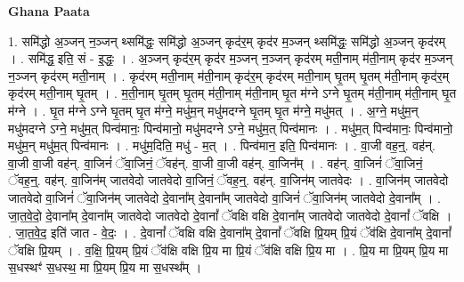 \documentclass[17pt]{extarticle}
\begin{document}
\textbf{Ghana Paata } \newline

1. समि॑द्धो अ॒ञ्जन् न॒ञ्जन् थ्समि॑द्धः॒ समि॑द्धो अ॒ञ्जन् कृद॑र॒म् कृद॑र म॒ञ्जन् थ्समि॑द्धः॒ समि॑द्धो अ॒ञ्जन् कृद॑रम् । . समि॑द्ध॒ इति॒ सं - इ॒द्धः॒ । . अ॒ञ्जन् कृद॑र॒म् कृद॑र म॒ञ्जन् न॒ञ्जन् कृद॑रम् मती॒नाम् म॑ती॒नाम् कृद॑र म॒ञ्जन् न॒ञ्जन् कृद॑रम् मती॒नाम् । . कृद॑रम् मती॒नाम् म॑ती॒नाम् कृद॑र॒म् कृद॑रम् मती॒नाम् घृ॒तम् घृ॒तम् म॑ती॒नाम् कृद॑र॒म् कृद॑रम् मती॒नाम् घृ॒तम् । . म॒ती॒नाम् घृ॒तम् घृ॒तम् म॑ती॒नाम् म॑ती॒नाम् घृ॒त म॑ग्ने ऽग्ने घृ॒तम् म॑ती॒नाम् म॑ती॒नाम् घृ॒त म॑ग्ने । . घृ॒त म॑ग्ने ऽग्ने घृ॒तम् घृ॒त म॑ग्ने॒ मधु॑म॒न् मधु॑मदग्ने घृ॒तम् घृ॒त म॑ग्ने॒ मधु॑मत् । . अ॒ग्ने॒ मधु॑म॒न् मधु॑मदग्ने ऽग्ने॒ मधु॑म॒त् पिन्व॑मानः॒ पिन्व॑मानो॒ मधु॑मदग्ने ऽग्ने॒ मधु॑म॒त् पिन्व॑मानः । . मधु॑म॒त् पिन्व॑मानः॒ पिन्व॑मानो॒ मधु॑म॒न् मधु॑म॒त् पिन्व॑मानः । . मधु॑म॒दिति॒ मधु॑ - म॒त् । . पिन्व॑मान॒ इति॒ पिन्व॑मानः । . वा॒जी वह॒न्॒. वह॑न्. वा॒जी वा॒जी वह॑न्. वा॒जिनं॑ ॅवा॒जिनं॒ ॅवह॑न्. वा॒जी वा॒जी वह॑न्. वा॒जिन᳚म् । . वह॑न्. वा॒जिनं॑ ॅवा॒जिनं॒ ॅवह॒न्॒. वह॑न्. वा॒जिन॑म् जातवेदो जातवेदो वा॒जिनं॒ ॅवह॒न्॒. वह॑न्. वा॒जिन॑म् जातवेदः । . वा॒जिन॑म् जातवेदो जातवेदो वा॒जिनं॑ ॅवा॒जिन॑म् जातवेदो दे॒वाना᳚म् दे॒वाना᳚म् जातवेदो वा॒जिनं॑ ॅवा॒जिन॑म् जातवेदो दे॒वाना᳚म् । . जा॒त॒वे॒दो॒ दे॒वाना᳚म् दे॒वाना᳚म् जातवेदो जातवेदो दे॒वानां᳚ ॅवक्षि वक्षि दे॒वाना᳚म् जातवेदो जातवेदो दे॒वानां᳚ ॅवक्षि । . जा॒त॒वे॒द॒ इति॑ जात - वे॒दः॒ । . दे॒वानां᳚ ॅवक्षि वक्षि दे॒वाना᳚म् दे॒वानां᳚ ॅवक्षि प्रि॒यम् प्रि॒यं ॅव॑क्षि दे॒वाना᳚म् दे॒वानां᳚ ॅवक्षि प्रि॒यम् । . व॒क्षि॒ प्रि॒यम् प्रि॒यं ॅव॑क्षि वक्षि प्रि॒य मा प्रि॒यं ॅव॑क्षि वक्षि प्रि॒य मा । . प्रि॒य मा प्रि॒यम् प्रि॒य मा स॒धस्थꣳ॑ स॒धस्थ॒ मा प्रि॒यम् प्रि॒य मा स॒धस्थ᳚म् । \newline
\end{document}
